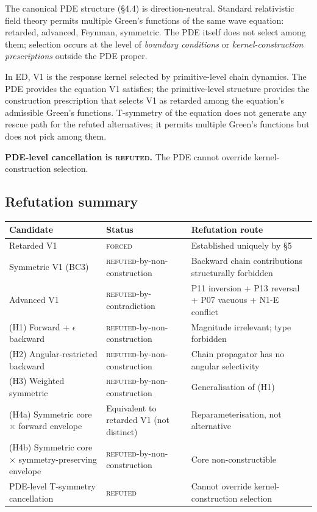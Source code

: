 \documentclass[11pt,a4paper]{article}
\begin{document}
The canonical PDE structure (\S4.4) is direction-neutral. Standard relativistic field theory permits multiple Green's functions of the same wave equation: retarded, advanced, Feynman, symmetric. The PDE itself does not select among them; selection occurs at the level of \emph{boundary conditions} or \emph{kernel-construction prescriptions} outside the PDE proper.

In ED, V1 is the response kernel selected by primitive-level chain dynamics. The PDE provides the equation V1 satisfies; the primitive-level structure provides the construction prescription that selects V1 as retarded among the equation's admissible Green's functions. T-symmetry of the equation does not generate any rescue path for the refuted alternatives; it permits multiple Green's functions but does not pick among them.

\textbf{PDE-level cancellation is \textsc{refuted}.} The PDE cannot override kernel-construction selection.

\subsection{Refutation summary}

\begin{longtable}{p{} p{} p{}}
\toprule
\textbf{Candidate} & \textbf{Status} & \textbf{Refutation route} \\
\midrule
\endhead
Retarded V1 & \textsc{forced} & Established uniquely by \S5 \\
Symmetric V1 (BC3) & \textsc{refuted}-by-non-construction & Backward chain contributions structurally forbidden \\
Advanced V1 & \textsc{refuted}-by-contradiction & P11 inversion + P13 reversal + P07 vacuous + N1-E conflict \\
(H1) Forward + $\epsilon$ backward & \textsc{refuted}-by-non-construction & Magnitude irrelevant; type forbidden \\
(H2) Angular-restricted backward & \textsc{refuted}-by-non-construction & Chain propagator has no angular selectivity \\
(H3) Weighted symmetric & \textsc{refuted}-by-non-construction & Generalisation of (H1) \\
(H4a) Symmetric core $\times$ forward envelope & Equivalent to retarded V1 (not distinct) & Reparameterisation, not alternative \\
(H4b) Symmetric core $\times$ symmetry-preserving envelope & \textsc{refuted}-by-non-construction & Core non-constructible \\
PDE-level T-symmetry cancellation & \textsc{refuted} & Cannot override kernel-construction selection \\
\bottomrule
\end{longtable}
\end{document}
